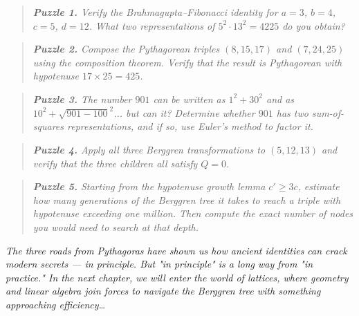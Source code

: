 \begin{quote}
\itshape \textbf{Puzzle 1.} Verify the Brahmagupta--Fibonacci identity for $a = 3$, $b = 4$, $c = 5$, $d = 12$. What two representations of $5^2 \cdot 13^2 = 4225$ do you obtain?
\end{quote}

\begin{quote}
\itshape \textbf{Puzzle 2.} Compose the Pythagorean triples $(8, 15, 17)$ and $(7, 24, 25)$ using the composition theorem. Verify that the result is Pythagorean with hypotenuse $17 \times 25 = 425$.
\end{quote}

\begin{quote}
\itshape \textbf{Puzzle 3.} The number $901$ can be written as $1^2 + 30^2$ and as $10^2 + \sqrt{901 - 100}^2$... but can it? Determine whether $901$ has two sum-of-squares representations, and if so, use Euler's method to factor it.
\end{quote}

\begin{quote}
\itshape \textbf{Puzzle 4.} Apply all three Berggren transformations to $(5, 12, 13)$ and verify that the three children all satisfy $Q = 0$.
\end{quote}

\begin{quote}
\itshape \textbf{Puzzle 5.} Starting from the hypotenuse growth lemma $c' \geq 3c$, estimate how many generations of the Berggren tree it takes to reach a triple with hypotenuse exceeding one million. Then compute the exact number of nodes you would need to search at that depth.
\end{quote}


\bigskip


\textit{The three roads from Pythagoras have shown us how ancient identities can crack modern secrets --- in principle. But "in principle" is a long way from "in practice." In the next chapter, we will enter the world of lattices, where geometry and linear algebra join forces to navigate the Berggren tree with something approaching efficiency\ldots{}}

